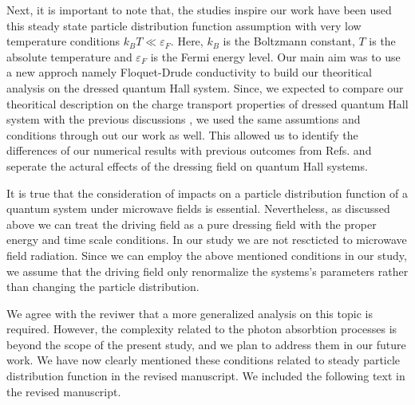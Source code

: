 \documentclass{article}
\begin{document}
Next, it is important to note that, the studies \cite{wackerl20,wackerlthesis20,dini16,endo09} inspire our work have been used this steady state particle distribution function assumption with very low temperature conditions $k_B T \ll \varepsilon_F$. Here, $k_B$ is the Boltzmann constant, $T$ is the absolute temperature and $\varepsilon_F$ is the Fermi energy level.
Our main aim was to use a new approch namely Floquet-Drude conductivity \cite{wackerl20} to build our theoritical analysis on the dressed quantum Hall system.
Since, we expected to compare our theoritical description on the charge transport properties of dressed quantum Hall system with the previous discussions \cite{dini16,endo09}, we used the same assumtions and conditions through out our work as well.
This allowed us to identify the differences of our numerical results with previous outcomes from Refs. \cite{dini16,endo09} and seperate the actural effects of the dressing field on quantum Hall systems.

It is true that the consideration of impacts on a particle distribution function of a quantum system under microwave fields is essential. Nevertheless, as discussed above we can treat the driving field as a pure dressing field with the proper energy and time scale conditions. In our study we are not rescticted to microwave field radiation. Since we can  employ the above mentioned conditions in our study, we assume that the driving field only renormalize the systems's parameters rather than changing the particle distribution.

We agree with the reviwer that a more generalized analysis on this topic is required. However, the complexity related to the photon absorbtion processes is beyond the scope of the present study, and we plan to address them in our future work. We have now clearly mentioned these conditions related to steady particle distribution function in the revised manuscript. We included the following text in the revised manuscript.
\end{document}
